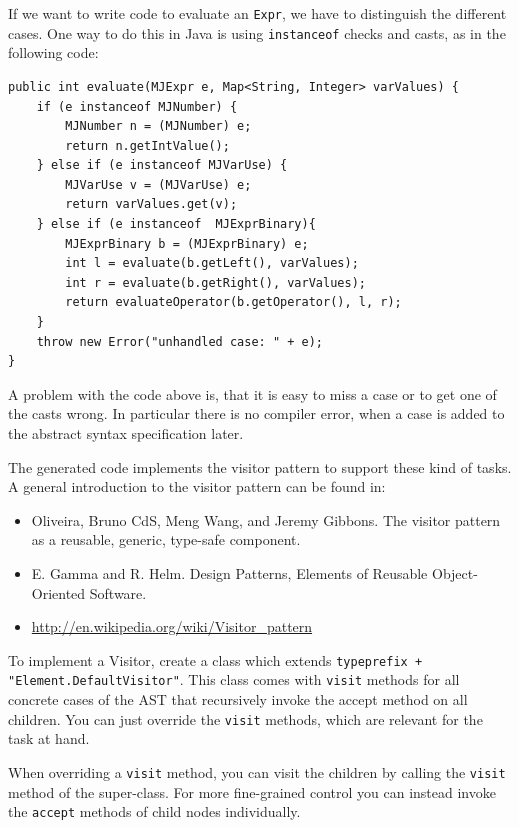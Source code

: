 \documentclass{scrartcl}
\begin{document}
If we want to write code to evaluate an \lstinline!Expr!, we have to distinguish the different cases.
One way to do this in Java is using \lstinline!instanceof! checks and casts, as in the following code:

\begin{lstlisting}
public int evaluate(MJExpr e, Map<String, Integer> varValues) {
    if (e instanceof MJNumber) {
        MJNumber n = (MJNumber) e;
        return n.getIntValue();
    } else if (e instanceof MJVarUse) {
        MJVarUse v = (MJVarUse) e;
        return varValues.get(v);
    } else if (e instanceof  MJExprBinary){
        MJExprBinary b = (MJExprBinary) e;
        int l = evaluate(b.getLeft(), varValues);
        int r = evaluate(b.getRight(), varValues);
        return evaluateOperator(b.getOperator(), l, r);
    }
    throw new Error("unhandled case: " + e);
}
\end{lstlisting}

A problem with the code above is, that it is easy to miss a case or to get one of the casts wrong.
In particular there is no compiler error, when a case is added to the abstract syntax specification later.

The generated code implements the visitor pattern to support these kind of tasks.
A general introduction to the visitor pattern can be found in:

\begin{itemize}
 \item Oliveira, Bruno CdS, Meng Wang, and Jeremy Gibbons. The visitor pattern as a reusable, generic, type-safe component.
 \item E. Gamma and R. Helm. Design Patterns, Elements of Reusable
Object-Oriented Software.
 \item \url{http://en.wikipedia.org/wiki/Visitor_pattern}
\end{itemize}

To implement a Visitor, create a class which extends \lstinline!typeprefix + "Element.DefaultVisitor"!.
This class comes with \lstinline!visit! methods for all concrete cases of the AST that recursively invoke the accept method on all children.
You can just override the \lstinline!visit! methods, which are relevant for the task at hand.

When overriding a \lstinline!visit! method, you can visit the children by calling the \lstinline!visit! method of the super-class.
For more fine-grained control you can instead invoke the \lstinline!accept! methods of child nodes individually.
\end{document}
